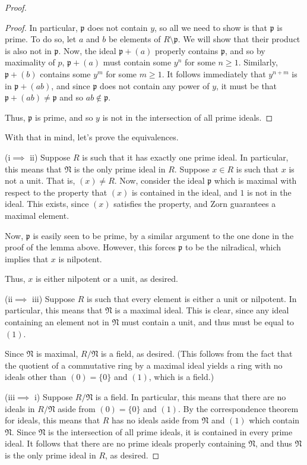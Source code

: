 \documentclass[12pt,reqno]{amsart}
\begin{document}
\begin{proof}
\begin{proof}
        In particular, $\mathfrak{p}$ does not contain $y$, so all we need to
        show is that $\mathfrak{p}$ is prime. To do so, let $a$ and $b$ be
        elements of $R\setminus\mathfrak{p}$. We will show that their product is
        also not in $\mathfrak{p}$. Now, the ideal $\mathfrak{p} + (a)$ properly
        contains $\mathfrak{p}$, and so by maximality of $p$, $\mathfrak{p}+(a)$
        must contain some $y^n$ for some $n\geq 1$. Similarly,
        $\mathfrak{p}+(b)$ contains some $y^m$ for some $m\geq 1$. It follows
        immediately that $y^{n+m}$ is in $\mathfrak{p} + (ab)$, and since
        $\mathfrak{p}$ does not contain any power of $y$, it must be that
        $\mathfrak{p} + (ab)\neq \mathfrak{p}$ and so $ab\not\in\mathfrak{p}$.

        Thus, $\mathfrak{p}$ is prime, and so $y$ is not in the intersection of
        all prime ideals.
    \end{proof}

    With that in mind, let's prove the equivalences.

    (i$\implies$ ii)
    Suppose $R$ is such that it has exactly one prime ideal. In particular, this
    means that $\mathfrak{N}$ is the only prime ideal in $R$. Suppose $x\in R$
    is such that $x$ is not a unit. That is, $(x)\neq R$. Now, consider the
    ideal $\mathfrak{p}$ which is maximal with respect to the property that
    $(x)$ is contained in the ideal, and $1$ is not in the ideal. This exists,
    since $(x)$ satisfies the property, and Zorn guarantees a maximal element.

    Now, $\mathfrak{p}$ is easily seen to be prime, by a similar argument to the
    one done in the proof of the lemma above. However, this forces
    $\mathfrak{p}$ to be the nilradical, which implies that $x$ is nilpotent.

    Thus, $x$ is either nilpotent or a unit, as desired.

    (ii$\implies$ iii)
    Suppose $R$ is such that every element is either a unit or nilpotent. In
    particular, this means that $\mathfrak{N}$ is a maximal ideal. This is
    clear, since any ideal containing an element not in $\mathfrak{N}$ must
    contain a unit, and thus must be equal to $(1)$.

    Since $\mathfrak{N}$ is maximal, $R/{\mathfrak{N}}$ is a field, as desired.
    (This follows from the fact that the quotient of a commutative ring by a
    maximal ideal yields a ring with no ideals other than $(0)= \{0\}$ and
    $(1)$, which is a field.)

    (iii$\implies$ i)
    Suppose $R/{\mathfrak{N}}$ is a field. In particular, this means that there
    are no ideals in $R/{\mathfrak{N}}$ aside from $(0)=\{0\}$ and $(1)$. By the
    correspondence theorem for ideals, this means that $R$ has no ideals aside
    from $\mathfrak{N}$ and $(1)$ which contain $\mathfrak{N}$. Since
    $\mathfrak{N}$ is the intersection of all prime ideals, it is contained in
    every prime ideal. It follows that there are no prime ideals properly
    containing $\mathfrak{N}$, and thus $\mathfrak{N}$ is the only prime ideal
    in $R$, as desired.
\end{proof}
\end{document}
